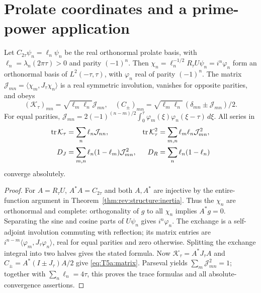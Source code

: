 \section{Prolate coordinates and a prime-power application}
\label{v6:sec:coordinates}
\begin{proposition}\label{prop:T5a:involution}
Let $C_{2\tau}\psi_n=\ell_n\psi_n$ be the real orthonormal prolate
basis, with $\ell_n=\lambda_n(2\pi\tau)>0$ and parity $(-1)^n$.
Then $\chi_n=\ell_n^{-1/2}R_\tau U\psi_n=i^n\varphi_n$ form an
orthonormal basis of $L^2(-\tau,\tau)$, with $\varphi_n$ real of
parity $(-1)^n$. The matrix
$\mathcal J_{mn}=\langle\chi_m,J_\tau\chi_n\rangle$ is a real
symmetric involution, vanishes for opposite parities, and obeys
\begin{equation}\label{eq:T5a:matrix}
(\mathcal K_\tau)_{mn}=\sqrt{\ell_m\ell_n}\mathcal J_{mn},\quad
(C_\pm)_{mn}=\sqrt{\ell_m\ell_n}\,
                    (\delta_{mn}\pm\mathcal J_{mn})/2 .
\end{equation}
For equal parities,
$\mathcal J_{mn}=2(-1)^{(n-m)/2}
\int_0^\tau\varphi_m(\xi)\varphi_n(\xi-\tau)\,d\xi$.
All series in
\begin{equation}\label{eq:T5a:traces}
\begin{aligned}
\operatorname{tr}\mathcal K_\tau&=\sum_n\ell_n\mathcal J_{nn},&
\operatorname{tr}\mathcal K_\tau^2&=\sum_{m,n}\ell_m\ell_n\mathcal J_{mn}^2,\\
D_J&=\sum_{m,n}\ell_n(1-\ell_m)\mathcal J_{mn}^2,&
D_R&=\sum_n\ell_n(1-\ell_n)
\end{aligned}
\end{equation}
converge absolutely.
\end{proposition}
\begin{proof}
For $A=R_\tau U$, $A^*A=C_{2\tau}$ and both $A,A^*$ are
injective by the entire-function argument in
Theorem~\ref{thm:rev:structure:inertia}.
Thus the $\chi_n$ are orthonormal and complete: orthogonality of
$g$ to all $\chi_n$ implies $A^*g=0$.
Separating the sine and cosine parts of $U\psi_n$ gives $i^n\varphi_n$.
The exchange is a self-adjoint involution commuting with reflection;
its matrix entries are
$i^{n-m}\langle\varphi_m,J_\tau\varphi_n\rangle$, real for equal
parities and zero otherwise. Splitting the exchange integral into
two halves gives the stated formula.
Now $\mathcal K_\tau=A^*J_\tau A$ and
$C_\pm=A^*(I\pm J_\tau)A/2$ give \eqref{eq:T5a:matrix}.
Parseval yields $\sum_m\mathcal J_{mn}^2=1$; together with
$\sum_n\ell_n=4\tau$, this proves the trace formulas and all
absolute-convergence assertions.
\end{proof}

